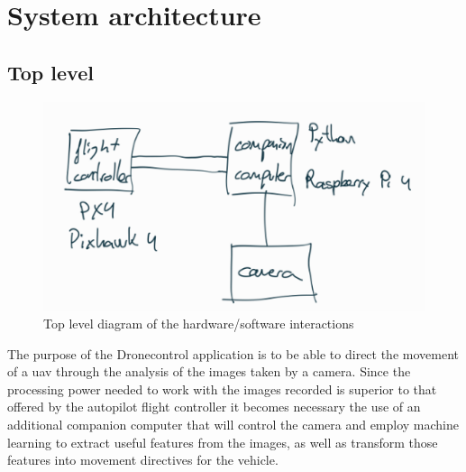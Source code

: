 \section{System architecture}
\label{sec:sysarch}

\subsection{Top level}

\begin{figure}
  \centering
  \includegraphics[keepaspectratio]{img/toplevel-sysarch.png}
  \caption{Top level diagram of the hardware/software interactions }\label{fig:toplevel}
\end{figure}

The purpose of the Dronecontrol application is to be able to direct the movement of a \gls{uav} through the analysis of the images taken by a camera.
Since the processing power needed to work with the images recorded is superior to that offered by the autopilot flight controller it becomes necessary the use of an additional companion computer that will control the camera and employ machine learning to extract useful features from the images, as well as transform those features into movement directives for the vehicle.

